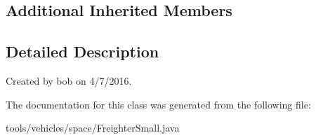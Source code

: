 \subsection*{Additional Inherited Members}


\subsection{Detailed Description}
Created by bob on 4/7/2016. 

The documentation for this class was generated from the following file\+:\begin{DoxyCompactItemize}
\item 
tools/vehicles/space/Freighter\+Small.\+java\end{DoxyCompactItemize}
